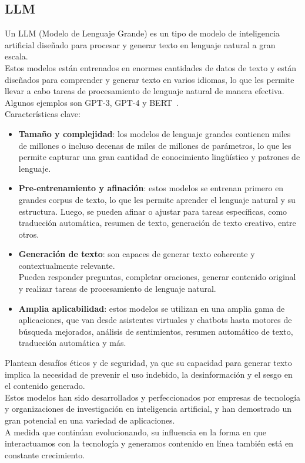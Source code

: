 \subsection{LLM~\cite{mirchandani2023large}}
\label{LLM}
Un LLM (Modelo de Lenguaje Grande) es un tipo de modelo de inteligencia artificial
 diseñado para procesar y generar texto en lenguaje natural a gran escala.\\
Estos modelos están entrenados en enormes cantidades de datos de texto 
y están diseñados para comprender y generar texto en varios idiomas, 
lo que les permite llevar a cabo tareas de procesamiento de lenguaje natural de manera efectiva. \\
Algunos ejemplos son GPT-3, GPT-4 y BERT~\cite{BertSentimentModel1}.\\
Características clave:
\begin{itemize}
    \item \textbf{Tamaño y complejidad}: los modelos de lenguaje grandes contienen miles de millones o 
    incluso decenas de miles de millones de parámetros, lo que les permite capturar una 
    gran cantidad de conocimiento lingüístico y patrones de lenguaje.
    \item \textbf{Pre-entrenamiento y afinación}: estos modelos se entrenan primero en grandes corpus de texto, lo que les permite aprender el lenguaje natural y su estructura. Luego, se pueden afinar o ajustar para tareas específicas, como traducción automática, resumen de texto, generación de texto creativo, entre otros.
    \item \textbf{Generación de texto}: son capaces de generar texto coherente y contextualmente relevante.\\
    Pueden responder preguntas, completar oraciones, generar contenido original 
    y realizar tareas de procesamiento de lenguaje natural.
    \item \textbf{Amplia aplicabilidad}: estos modelos se utilizan en una amplia gama de aplicaciones, 
    que van desde asistentes virtuales y chatbots hasta motores de búsqueda mejorados, 
    análisis de sentimientos, resumen automático de texto, traducción automática y más.
\end{itemize}
 
Plantean desafíos éticos y de seguridad, ya que su 
capacidad para generar texto implica la necesidad de prevenir el uso indebido, 
la desinformación y el sesgo en el contenido generado.\\
Estos modelos han sido desarrollados y perfeccionados por empresas de tecnología y 
organizaciones de investigación en inteligencia artificial, y han demostrado 
un gran potencial en una variedad de aplicaciones. \\
A medida que continúan evolucionando, su influencia 
en la forma en que interactuamos con la tecnología y generamos contenido 
en línea también está en constante crecimiento.


